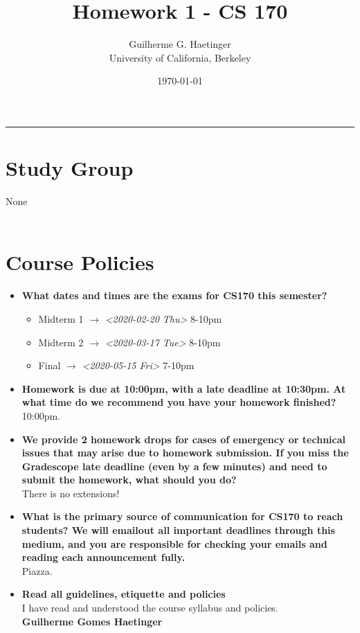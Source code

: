 \documentclass[11pt]{article}
\author{Guilherme G. Haetinger \\ University of California, Berkeley}
\date{\today}
\title{Homework 1 - CS 170}
\begin{document}
\maketitle
\noindent\rule{\textwidth}{0.5pt}

\section{Study Group}
\label{sec:org205d6ea}
None\\
\newpage\\
\section{Course Policies}
\label{sec:org986551d}
\begin{itemize}
\item \textbf{What dates and times are the exams for CS170 this semester?}\\
\begin{itemize}
\item Midterm 1 \(\to\) \textit{<2020-02-20 Thu> } 8-10pm\\
\item Midterm 2 \(\to\) \textit{<2020-03-17 Tue> } 8-10pm\\
\item Final \(\to\) \textit{<2020-05-15 Fri> } 7-10pm\\
\end{itemize}
\item \textbf{Homework is due at 10:00pm, with a late deadline at 10:30pm. At what time do we recommend you have your homework finished?}\\
10:00pm.\\
\item \textbf{We provide 2 homework drops for cases of emergency or technical issues that may arise due to homework submission. If you miss the Gradescope late deadline (even by a few minutes) and need to submit the homework, what should you do?}\\
There is no extensions!\\
\item \textbf{What is the primary source of communication for CS170 to reach students? We will emailout all important deadlines through this medium, and you are responsible for checking your emails and reading each announcement fully.}\\
Piazza.\\
\item \textbf{Read all guidelines, etiquette and policies}\\
I have read and understood the course syllabus and policies.\\
\textbf{Guilherme Gomes Haetinger}\\
\end{itemize}
\newpage\\
\end{document}
